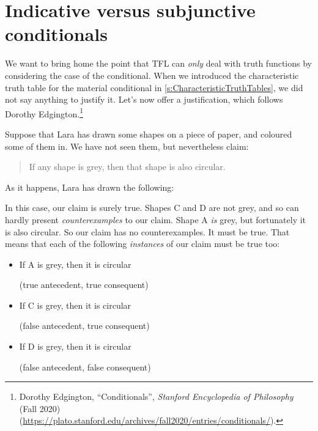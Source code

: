 \section{Indicative versus subjunctive conditionals}\label{s:IndicativeSubjunctive}
We want to bring home the point that TFL can \emph{only} deal with
truth functions by considering the case of the conditional. When we
introduced the characteristic truth table for the material conditional
in \cref{s:CharacteristicTruthTables}, we did not say anything to
justify it. Let's now offer a justification, which follows Dorothy
Edgington.\footnote{Dorothy Edgington, ``Conditionals'',
\textit{Stanford Encyclopedia of Philosophy} (Fall 2020)
(\url{https://plato.stanford.edu/archives/fall2020/entries/conditionals/}).} 

Suppose that Lara has drawn some shapes on a piece of paper, and coloured some of them in. We have not seen them, but nevertheless claim:
	\begin{quote}
		If any shape is grey, then that shape is also circular.
	\end{quote}
As it happens, Lara has drawn the following:
\begin{center}
\end{center}
In this case, our claim is surely true.  Shapes C and D are not grey, and so can hardly present \emph{counterexamples} to our claim. Shape A \emph{is} grey, but fortunately it is also circular. So our claim has no counterexamples. It must be true. That means that each of the following \emph{instances} of our claim must be true too:
	\begin{itemize}
		\item If A is grey, then it is circular

		\qquad (true antecedent, true consequent)
		\item If C is grey, then it is circular

		\qquad (false antecedent, true consequent)
		\item If D is grey, then it is circular

		\qquad (false antecedent, false consequent)
	\end{itemize}
